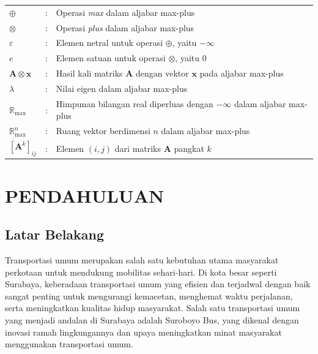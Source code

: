 \documentclass{file/TA-ITS}
\theoremstyle{definition}
\theoremstyle{definition}
\theoremstyle{plain}
\begin{document}
\DaftarSimbol
\begin{flushleft}
\begin{tabular}{lrl}

$\oplus$ &:& Operasi \textit{max} dalam aljabar max-plus \\

$\otimes$ &:& Operasi \textit{plus} dalam aljabar max-plus \\

$\varepsilon$ &:& Elemen netral untuk operasi $\oplus$, yaitu $-\infty$ \\

$e$ &:& Elemen satuan untuk operasi $\otimes$, yaitu $0$ \\

$\mathbf{A} \otimes \mathbf{x}$ &:& Hasil kali matriks $\mathbf{A}$ dengan vektor $\mathbf{x}$ pada aljabar max-plus \\

$\lambda$ &:& Nilai eigen dalam aljabar max-plus \\

$\mathbb{R}_{\max}$ &:& Himpunan bilangan real diperluas dengan $-\infty$ dalam aljabar max-plus \\

$\mathbb{R}_{\max}^n$ &:& Ruang vektor berdimensi $n$ dalam aljabar max-plus \\

$[\mathbf{A}^k]_{ij}$ &:& Elemen $(i,j)$ dari matriks $\mathbf{A}$ pangkat $k$ \\

\end{tabular}
\end{flushleft}

\BagianInti

\chapter{PENDAHULUAN}
\section{Latar Belakang}
\indent Transportasi umum merupakan salah satu kebutuhan utama masyarakat perkotaan untuk mendukung mobilitas sehari-hari. Di kota besar seperti Surabaya, keberadaan transportasi umum yang efisien dan terjadwal dengan baik sangat penting untuk mengurangi kemacetan, menghemat waktu perjalanan, serta meningkatkan kualitas hidup masyarakat. Salah satu transportasi umum yang menjadi andalan di Surabaya adalah Suroboyo Bus, yang dikenal dengan inovasi ramah lingkungannya dan upaya meningkatkan minat masyarakat menggunakan transportasi umum.
\end{document}
